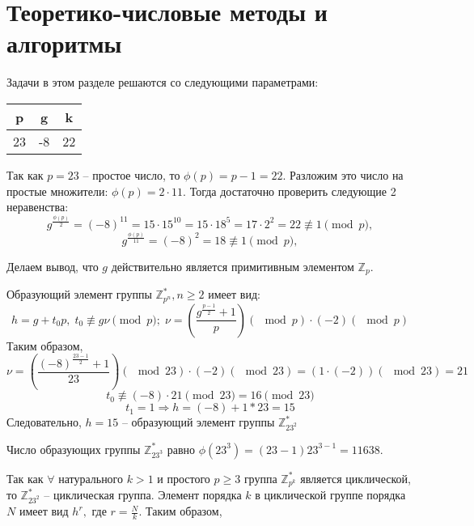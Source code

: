 \section{Теоретико-числовые методы и алгоритмы}

Задачи в этом разделе решаются со следующими параметрами:

\medskip

{\centering
\begin{tabular}{||c|c|c||}
\hline
\textbf{p} & \textbf{g} & \textbf{k} \\
\hline
23 & -8 & 22 \\
\hline
\end{tabular}

}

\medskip


Так как $p = 23$ -- простое число, то $\phi(p) = p - 1 = 22$. Разложим это число на простые множители: $\phi(p) = 2 \cdot 11$. Тогда достаточно проверить следующие 2 неравенства:
$$ g^{ \frac{\phi(p)}{2} } = (-8) ^ {11} = 15 \cdot 15 ^ {10} = 15 \cdot 18 ^ 5 = 17 \cdot 2 ^ 2 = 22 \not\equiv 1 \pmod p,$$
$$ g^{ \frac{\phi(p)}{11} } = (-8) ^ {2} = 18 \not\equiv 1 \pmod p,$$

Делаем вывод, что $g$ действительно является примитивным элементом $\mathbb{Z}_p$.


Образующий элемент группы $\mathbb{Z}_{p^n}^*, n \ge 2$ имеет вид:
$$ h = g + t_0 p, \; t_0 \not \equiv g \nu \pmod p; \; \nu = ( \frac{ g ^ {\frac{p -1}{2}} + 1}{ p } )(\!\!\!\!\!\! \mod p) \cdot (-2)(\!\!\!\!\!\! \mod p)$$
\noindent Таким образом,
$$ \nu = ( \frac{ (-8) ^ {\frac{23 - 1}{2}} + 1}{ 23 } )(\!\!\!\!\!\! \mod 23) \cdot (-2)(\!\!\!\!\!\! \mod 23) = ( 1 \cdot (-2))(\!\!\!\!\!\! \mod 23) = 21$$
$$ t_0 \not \equiv (-8) \cdot 21 \!\!\!\pmod {23} = 16 \!\!\!\pmod {23} $$
$$ t_1 = 1 \Rightarrow h = (-8) + 1 * 23 = 15 $$
Следовательно, $h = 15$ -- образующий элемент группы $\mathbb{Z}_{23^2}^*$


Число образующих группы $\mathbb{Z}_{23^3}^*$ равно $\phi(23^3) = (23 - 1) 23 ^ {3 - 1} = 11638.$


Так как $\forall$ натурального $k>1$ и простого $p \ge 3$ группа $\mathbb{Z}_{p^k}^*$ является циклической, то $\mathbb{Z}_{23^2}^*$ -- циклическая группа. Элемент порядка $k$ в циклической группе порядка $N$ имеет вид $h^r,$ где $r = \frac{N}{k}.$ Таким образом,

